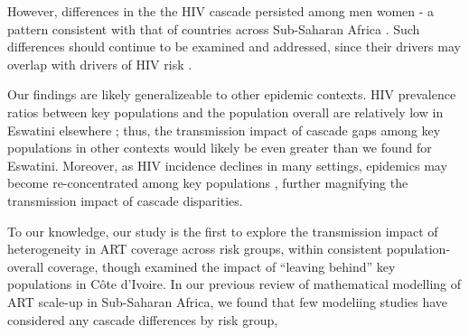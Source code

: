 However, differences in the the HIV cascade persisted among men \vs women - a pattern consistent with that of countries across Sub-Saharan Africa %
 \cite{SHIMS1,SHIMS2,SHIMS3}. %
Such differences should continue to be examined and addressed, %
since their drivers may overlap with drivers of HIV risk \cite{Akullian2017,Camlin2019}. %
\par
Our findings are likely generalizeable to other epidemic contexts. %
HIV prevalence ratios between key populations and the population overall
are relatively low in Eswatini \vs elsewhere \cite{Baral2012,Hessou2019};
thus, the transmission impact of cascade gaps among key populations in other contexts
would likely be even greater than we found for Eswatini.
Moreover, as HIV incidence declines in many settings,
epidemics may become re-concentrated among key populations \cite{Brown2019,Garnett2021},
further magnifying the transmission impact of cascade disparities.
\par %
To our knowledge, our study is the first to explore the transmission impact of
heterogeneity in ART coverage across risk groups,
within consistent population-overall coverage,
though \citet{Maheu-Giroux2017art} examined the impact of
``leaving behind'' key populations in C\^{o}te d'Ivoire. %
In our previous review of mathematical modelling of ART scale-up in Sub-Saharan Africa,  %
we found that few modeliing studies have considered any cascade differences by risk group, %
